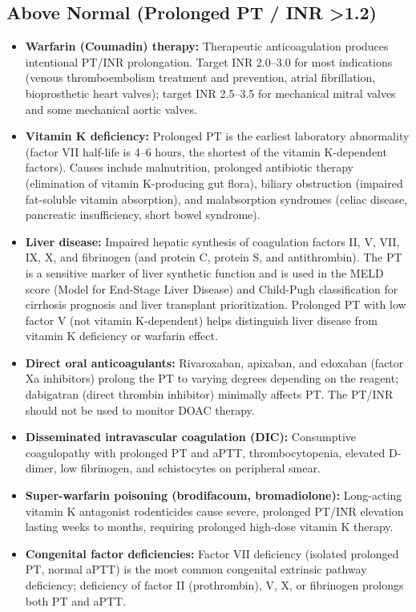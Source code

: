 \subsection*{Above Normal (Prolonged PT / INR >1.2)}
\begin{itemize}
  \item \textbf{Warfarin (Coumadin) therapy:} Therapeutic anticoagulation produces intentional PT/INR prolongation. Target INR 2.0--3.0 for most indications (venous thromboembolism treatment and prevention, atrial fibrillation, bioprosthetic heart valves); target INR 2.5--3.5 for mechanical mitral valves and some mechanical aortic valves.
  \item \textbf{Vitamin K deficiency:} Prolonged PT is the earliest laboratory abnormality (factor VII half-life is 4--6 hours, the shortest of the vitamin K-dependent factors). Causes include malnutrition, prolonged antibiotic therapy (elimination of vitamin K-producing gut flora), biliary obstruction (impaired fat-soluble vitamin absorption), and malabsorption syndromes (celiac disease, pancreatic insufficiency, short bowel syndrome).
  \item \textbf{Liver disease:} Impaired hepatic synthesis of coagulation factors II, V, VII, IX, X, and fibrinogen (and protein C, protein S, and antithrombin). The PT is a sensitive marker of liver synthetic function and is used in the MELD score (Model for End-Stage Liver Disease) and Child-Pugh classification for cirrhosis prognosis and liver transplant prioritization. Prolonged PT with low factor V (not vitamin K-dependent) helps distinguish liver disease from vitamin K deficiency or warfarin effect.
  \item \textbf{Direct oral anticoagulants:} Rivaroxaban, apixaban, and edoxaban (factor Xa inhibitors) prolong the PT to varying degrees depending on the reagent; dabigatran (direct thrombin inhibitor) minimally affects PT. The PT/INR should not be used to monitor DOAC therapy.
  \item \textbf{Disseminated intravascular coagulation (DIC):} Consumptive coagulopathy with prolonged PT and aPTT, thrombocytopenia, elevated D-dimer, low fibrinogen, and schistocytes on peripheral smear.
  \item \textbf{Super-warfarin poisoning (brodifacoum, bromadiolone):} Long-acting vitamin K antagonist rodenticides cause severe, prolonged PT/INR elevation lasting weeks to months, requiring prolonged high-dose vitamin K therapy.
  \item \textbf{Congenital factor deficiencies:} Factor VII deficiency (isolated prolonged PT, normal aPTT) is the most common congenital extrinsic pathway deficiency; deficiency of factor II (prothrombin), V, X, or fibrinogen prolongs both PT and aPTT.

\end{itemize}
